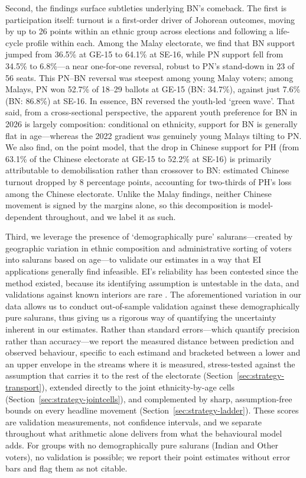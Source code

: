 \documentclass[11pt]{article}
\begin{document}
Second, the findings surface subtleties underlying BN's comeback. The first is participation itself: turnout is a first-order driver of Johorean outcomes, moving by up to 26 points within an ethnic group across elections and following a life-cycle profile within each. Among the Malay electorate, we find that BN support jumped from 36.5\% at GE-15 to 64.1\% at SE-16, while PN support fell from 34.5\% to 6.8\%---a near one-for-one reversal, robust to PN's stand-down in 23 of 56 seats. This PN--BN reversal was steepest among young Malay voters; among Malays, PN won 52.7\% of 18--29 ballots at GE-15 (BN: 34.7\%), against just 7.6\% (BN: 86.8\%) at SE-16. In essence, BN reversed the youth-led `green wave'. That said, from a cross-sectional perspective, the apparent youth preference for BN in 2026 is largely composition: conditional on ethnicity, support for BN is generally flat in age---whereas the 2022 gradient was genuinely young Malays tilting to PN. We also find, on the point model, that the drop in Chinese support for PH (from 63.1\% of the Chinese electorate at GE-15 to 52.2\% at SE-16) is primarily attributable to demobilisation rather than crossover to BN: estimated Chinese turnout dropped by 8 percentage points, accounting for two-thirds of PH's loss among the Chinese electorate. Unlike the Malay findings, neither Chinese movement is signed by the margins alone, so this decomposition is model-dependent throughout, and we label it as such.

Third, we leverage the presence of `demographically pure' salurans---created by geographic variation in ethnic composition and administrative sorting of voters into salurans based on age---to validate our estimates in a way that EI applications generally find infeasible. EI's reliability has been contested since the method existed, because its identifying assumption is untestable in the data\cite{freedman1998,cho1998,wakefield2004}, and validations against known interiors are rare \cite{hudson2010,park2014,klima2016,plesciadesio2018,pavia2022}. The aforementioned variation in our data allows us to conduct out-of-sample validation against these demographically pure salurans, thus giving us a rigorous way of quantifying the uncertainty inherent in our estimates. Rather than standard errors---which quantify precision rather than accuracy---we report the measured distance between prediction and observed behaviour, specific to each estimand and bracketed between a lower and an upper envelope in the streams where it is measured, stress-tested against the assumption that carries it to the rest of the electorate (Section~\ref{sec:strategy-transport}), extended directly to the joint ethnicity-by-age cells (Section~\ref{sec:strategy-jointcells}), and complemented by sharp, assumption-free bounds on every headline movement (Section~\ref{sec:strategy-ladder}). These scores are validation measurements, not confidence intervals, and we separate throughout what arithmetic alone delivers from what the behavioural model adds. For groups with no demographically pure salurans (Indian and Other voters), no validation is possible; we report their point estimates without error bars and flag them as not citable.
\end{document}
